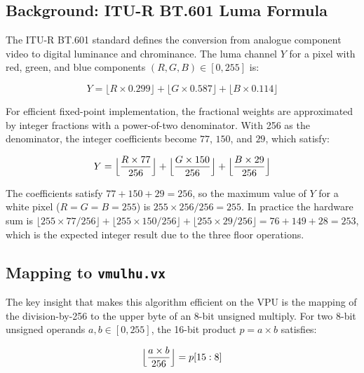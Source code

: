\subsection{Background: ITU-R BT.601 Luma Formula}

The ITU-R BT.601 standard defines the conversion from analogue component video to
digital luminance and chrominance. The luma channel $Y$ for a pixel with red, green,
and blue components $(R, G, B) \in [0, 255]$ is:

\begin{equation}
  Y = \bigl\lfloor R \times 0.299 \bigr\rfloor +
      \bigl\lfloor G \times 0.587 \bigr\rfloor +
      \bigl\lfloor B \times 0.114 \bigr\rfloor
  \label{eq:bt601_float}
\end{equation}

For efficient fixed-point implementation, the fractional weights are approximated by
integer fractions with a power-of-two denominator. With 256 as the denominator, the
integer coefficients become $77$, $150$, and $29$, which satisfy:

\begin{equation}
  Y = \Bigl\lfloor \frac{R \times 77}{256} \Bigr\rfloor +
      \Bigl\lfloor \frac{G \times 150}{256} \Bigr\rfloor +
      \Bigl\lfloor \frac{B \times 29}{256} \Bigr\rfloor
  \label{eq:bt601_fixed}
\end{equation}

The coefficients satisfy $77 + 150 + 29 = 256$, so the maximum value of $Y$ for a
white pixel ($R=G=B=255$) is $255 \times 256 / 256 = 255$. In practice the hardware
sum is $\lfloor 255 \times 77/256 \rfloor + \lfloor 255 \times 150/256 \rfloor +
\lfloor 255 \times 29/256 \rfloor = 76 + 149 + 28 = 253$, which is the expected
integer result due to the three floor operations.

\subsection{Mapping to \texttt{vmulhu.vx}}

The key insight that makes this algorithm efficient on the VPU is the mapping of the
division-by-256 to the upper byte of an 8-bit unsigned multiply. For two 8-bit unsigned
operands $a, b \in [0, 255]$, the 16-bit product $p = a \times b$ satisfies:

\begin{equation}
  \Bigl\lfloor \frac{a \times b}{256} \Bigr\rfloor = p[15:8]
\end{equation}

